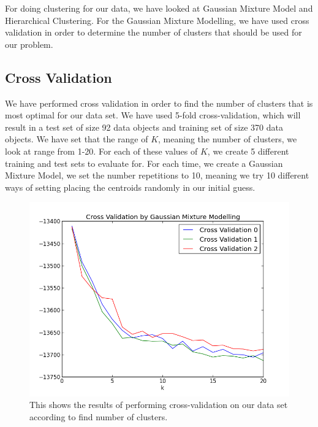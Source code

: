 For doing clustering for our data, we have looked at Gaussian Mixture Model and Hierarchical Clustering. For the Gaussian Mixture Modelling, we have used cross validation in order to determine the number of clusters that should be used for our problem.


\subsection{Cross Validation}

We have performed cross validation in order to find the number of clusters that is most optimal for our data set. We have used 5-fold cross-validation, which will result in a test set of size 92 data objects and training set of size 370 data objects. We have set that the range of $K$, meaning the number of clusters, we look at range from 1-20. For each of these values of $K$, we create 5 different training and test sets to evaluate for. For each time, we create a Gaussian Mixture Model, we set the number repetitions to 10, meaning we try 10 different ways of setting placing the centroids randomly in our initial guess.

\begin{figure}[H]
\center
\includegraphics[scale=0.5]{pictures/CVKGaussian.png}
\caption{\footnotesize This shows the results of performing cross-validation on our data set according to find number of clusters.}
\label{CVK}
\end{figure}


